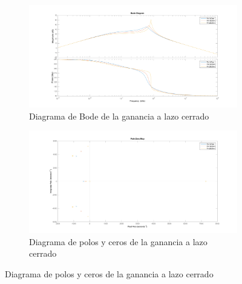 \documentclass[e4_tp2_main.tex]{subfiles}
\begin{document}
\begin{figure}[H]
  \begin{subfigure}[b]{0.5\textwidth}
    \includegraphics[width=\textwidth, height=\textwidth]{Imagenes/Punto1/bode.png}
    \caption{ Diagrama de Bode de la ganancia a lazo cerrado}
    \label{fig:f12}
  \end{subfigure}
  \hfill
  \begin{subfigure}[b]{0.5\textwidth}
    \includegraphics[width=\textwidth, height=\textwidth]{Imagenes/Punto1/polosyceros.png}
    \caption{ Diagrama de polos y ceros de la ganancia a lazo cerrado}
    \label{fig:f22}
  \end{subfigure}
\end{figure}  
  
\end{document}

